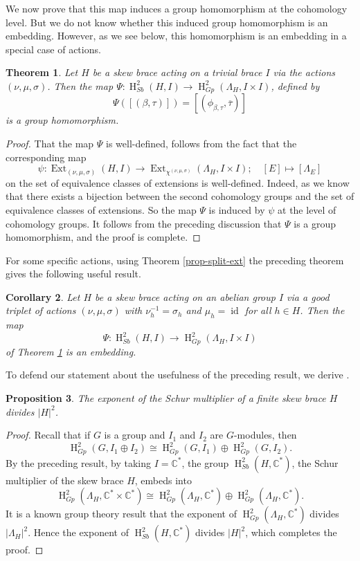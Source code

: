\documentclass[11pt]{amsart}
\theoremstyle{thrm}
\theoremstyle{plain}
\newtheorem{thm}{Theorem}[section]
\newtheorem{prop}[thm]{Proposition}
\newtheorem{cor}[thm]{Corollary}
\theoremstyle{definition}
\newcommand{\Ho}{\operatorname{H} }
\newcommand{\Id}{\operatorname{id}}
\newcommand{\Ext}{\operatorname{Ext} }
\numberwithin{equation}{section}
\begin{document}
We now prove that this map induces a group homomorphism at the cohomology level. But we do not know whether this induced group homomorphism is an embedding. However, as we see below, this homomorphism is an embedding in a special case  of actions. 
\begin{thm}\label{Psi-hom}
Let $H$ be a skew brace acting on a trivial brace $I$ via the actions $(\nu, \mu, \sigma)$. Then the  map $\Psi: \Ho^2_{Sb}(H, I) \to \Ho^2_{Gp}(\Lambda_H, I \times I)$, defined by
$$\Psi([(\beta, \tau)]) = [(\phi_{\beta, \tau}, \overline{\tau})]$$
is a group homomorphism.
\end{thm}
\begin{proof}
That 	the map $\Psi$ is well-defined, follows from the fact that the corresponding map
	\[
	\psi: \Ext_{(\nu, \mu, \sigma)}(H, I) \rightarrow \Ext_{\chi^{(\nu, \mu, \sigma)}}(\Lambda_H, I \times I);
	\quad [E] \mapsto [\Lambda_E]
	\]
on the set of equivalence classes of extensions is  well-defined. Indeed, as we know that there exists a bijection between the second cohomology groups and the set of equivalence classes of extensions. So the map $\Psi$ is induced by $\psi$ at the level of cohomology groups. It follows from the preceding discussion that $\Psi$ is a group homomorphism, and the proof is complete.
\end{proof}


For some specific  actions, using Theorem \ref{prop-split-ext} the preceding theorem  gives the following useful result.
\begin{cor}\label{useful-cor}
Let $H$ be a skew brace acting on an abelian group $I$ via a good triplet of actions $(\nu, \mu, \sigma)$ with $\nu_h^{-1} = \sigma_h$ and $\mu_h = \Id$ for all $h \in H$. Then the map
	\[
	\Psi: \Ho^2_{Sb}(H, I) \rightarrow \Ho^2_{Gp}(\Lambda_H, I \times I)
	\]
	of Theorem \ref{Psi-hom} is an embedding.
\end{cor}


To defend our statement about the usefulness of the preceding result, we derive \cite[Theorem 2.2]{LV24}. 


 \begin{prop}
The exponent of the Schur multiplier of a finite skew brace $H$ divides $|H|^2$.
\end{prop}
\begin{proof}
Recall  that  if $G$ is a group and $I_1$ and $I_2$ are $G$-modules, then
$$\Ho^2_{Gp}(G, I_1 \oplus I_2) \cong \Ho^2_{Gp}(G, I_1) \oplus \Ho^2_{Gp}(G, I_2).$$
By the preceding result, by taking $I = \mathbb{C}^*$, the group $\Ho^2_{Sb}(H, \mathbb{C}^*)$, the Schur multiplier of the skew brace $H$, embeds into
$$\Ho^2_{Gp}(\Lambda_H, \mathbb{C}^* \times \mathbb{C}^*) \cong \Ho^2_{Gp}(\Lambda_H, \mathbb{C}^*) \oplus \Ho^2_{Gp}(\Lambda_H, \mathbb{C}^*).$$
It is a known group theory result that the exponent of $\Ho^2_{Gp}(\Lambda_H, \mathbb{C}^*)$ divides $|\Lambda_H|^2$. Hence the exponent of $\Ho^2_{Sb}(H, \mathbb{C}^*)$  divides $|H|^2$, which completes the proof.
\end{proof}
\end{document}
